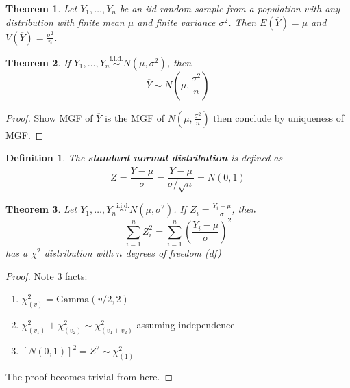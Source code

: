 \documentclass[a4paper,12pt]{article}
\theoremstyle{nonitalic}
\newtheorem{definition}{Definition}[subsection]
\newtheorem{theorem}{Theorem}[subsection]
\begin{document}
    \begin{theorem}
        Let $Y_1, \ldots, Y_n$ be an iid random sample from a population with any distribution with finite mean $\mu$ and finite variance $\sigma^2$. Then \(E(\overline{Y}) = \mu\) and \(V(\overline{Y}) = \frac{\sigma^2}{n}\).
    \end{theorem}

    \begin{theorem}
        If $Y_1, \ldots, Y_n \overset{\text{i.i.d.}}{\sim} N\left(\mu, \sigma^2\right)$, then
        \[
        \overline{Y} \sim N\left(\mu, \frac{\sigma^2}{n}\right)
        \]
    \end{theorem}
    
    
    \begin{proof}
        Show MGF of $\overline{Y}$ is the MGF of $N\left(\mu, \frac{\sigma^2}{n}\right)$ then conclude by uniqueness of MGF.
    \end{proof}
    
    \begin{definition}
        The \textbf{standard normal distribution} is defined as
        \[
            Z = \frac{Y - \mu}{\sigma} = \frac{\overline{Y} - \mu}{\sigma/\sqrt{n}} = N(0,1)
        \]
    \end{definition}

    \begin{theorem}
        Let \( Y_1, \ldots, Y_n \overset{\text{i.i.d.}}{\sim} N(\mu, \sigma^2) \). If \( Z_i = \frac{Y_i - \mu}{\sigma} \), then
        \[
        \sum_{i=1}^{n} Z_i^2 = \sum_{i=1}^{n} \left( \frac{Y_i - \mu}{\sigma} \right)^2
        \]
        has a \(\chi^2\) distribution with \(n\) degrees of freedom (df)
    \end{theorem}
    
    \begin{proof}
        Note 3 facts:
        \begin{enumerate}
            \item \(\chi^2_{(v)} = \text{Gamma}(v/2, 2)\)
            \item \(\chi^2_{(v_1)} + \chi^2_{(v_2)} \sim \chi^2_{(v_1 + v_2)}\) assuming independence
            \item \([N(0,1)]^2 = Z^2 \sim \chi^2_{(1)}\)
        \end{enumerate}

        The proof becomes trivial from here.
    \end{proof}
\end{document}
